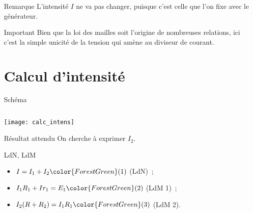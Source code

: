 \documentclass[a4paper, 12pt, final, garamond]{book}
\begin{document}
\begin{tcbraster}[raster columns=2, raster equal height=rows]
    \begin{NCrema}{Remarque}
        L'intensité $I$ ne va pas changer, puisque c'est celle que l'on fixe
        avec le générateur.
    \end{NCrema}
    \begin{NCror}{Important}
        Bien que la loi des mailles soit l'origine de nombreuses relations, ici
        c'est la simple unicité de la tension qui amène au diviseur de courant.
    \end{NCror}
\end{tcbraster}

\section{Calcul d'intensité}
\begin{tcbraster}[raster columns=5, raster equal height=rows]
    \begin{NCdefi}[raster multicolumn=3]{Schéma}
        \subsection{}
        \begin{center}
            \texttt{[image: calc\_intens]}
        \end{center}
    \end{NCdefi}
    \begin{tcolorbox}[blankest, raster multicolumn=2, space to=\myspace]
        \begin{tcbraster}[raster columns=1]
            \begin{NCprop}[add to natural height=\myspace]{Résultat attendu}
                On cherche à exprimer $I_2$.
            \end{NCprop}
            \begin{NCrapp}{{LdN, LdM}}
                \begin{itemize}
                    \item $I = I_1 + I_2 \color{ForestGreen}(1)$ (LdN)~;
                    \item $I_1R_1 + Ir_1 = E_1 \color{ForestGreen}(2)$ (LdM 1)~;
                    \item $I_2(R+R_2) = I_1R_1 \color{ForestGreen}(3)$ (LdM 2).
                \end{itemize}
            \end{NCrapp}
        \end{tcbraster}
    \end{tcolorbox}
\end{tcbraster}
\end{document}
